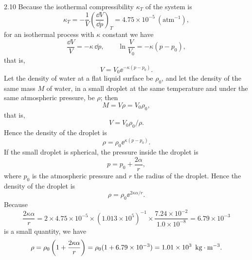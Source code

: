 \begin{solution}{2.10}
Because the isothermal compressibility $\kappa_T$ of the system is
\[
\kappa_T=-\frac{1}{V}\left(\frac{\dd V}{\dd p}\right)_T=4.75\times10^{-5}\ (\text{atm}^{-1}),
\]
for an isothermal process with $\kappa$ constant we have
\[
\frac{\dd V}{V}=-\kappa\,\dd p,
\qquad
\ln\frac{V}{V_0}=-\kappa(p-p_0),
\]
that is,
\[
V=V_0\ee^{-\kappa(p-p_0)}.
\]
Let the density of water at a flat liquid surface be $\rho_0$, and let the density of the same mass $M$ of water, in a small droplet at the same temperature and under the same atmospheric pressure, be $\rho$; then
\[
M=V\rho=V_0\rho_0,
\]
that is,
\[
V=V_0\rho_0/\rho.
\]
Hence the density of the droplet is
\[
\rho=\rho_0\ee^{\kappa(p-p_0)}.
\]
If the small droplet is spherical, the pressure inside the droplet is
\[
p=p_0+\frac{2\alpha}{r},
\]
where $p_0$ is the atmospheric pressure and $r$ the radius of the droplet. Hence the density of the droplet is
\[
\rho=\rho_0\ee^{2\kappa\alpha/r}.
\]
Because
\[
\frac{2\kappa\alpha}{r}
=2\times4.75\times10^{-5}\times(1.013\times10^{5})^{-1}
\times\frac{7.24\times10^{-2}}{1.0\times10^{-8}}
=6.79\times10^{-3}
\]
is a small quantity, we have
\[
\rho=\rho_0\left(1+\frac{2\kappa\alpha}{r}\right)
=\rho_0(1+6.79\times10^{-3})
=1.01\times10^{3}\ \,\mathrm{kg\cdot m^{-3}}.
\]
\end{solution}

